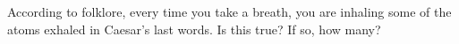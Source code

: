 According to folklore, every time you take a breath, you
are inhaling some of the atoms exhaled in Caesar's
last words. Is this true? If so, how many?
